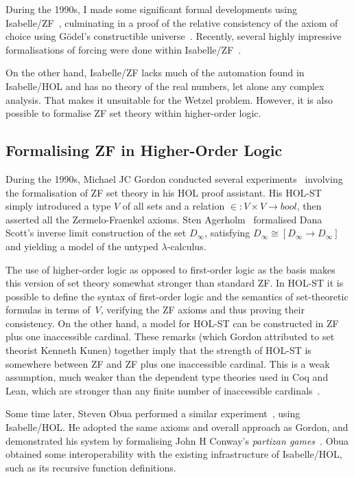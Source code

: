 \documentclass[runningheads]{llncs}
\begin{document}
During the 1990s, I made some significant formal developments using Isabelle/ZF~\cite{paulson-reflection}, culminating in a proof of the relative consistency of the axiom of choice using Gödel's constructible universe~\cite{paulson-consistency}. Recently, several highly impressive formalisations of forcing were done within Isabelle/ZF~\cite{gunther-forcing,Independence_CH-AFP}.

On the other hand, Isabelle/ZF lacks much of the automation found in Isabelle/HOL and has no theory of the real numbers, let alone any complex analysis.
That makes it unsuitable for the Wetzel problem. However, it is also possible to formalise ZF set theory within higher-order logic.

\subsection{Formalising ZF in Higher-Order Logic}

During the 1990s, Michael JC Gordon conducted several experiments~\cite{gordon-set-theory} involving the formalisation of ZF set theory in his HOL proof assistant. 
His HOL-ST simply introduced a type $V$ of all sets and a relation ${\in}:V\times V\to bool$, then asserted all the Zermelo-Fraenkel axioms. 
Sten Agerholm~\cite{agerholm-comparison} formalised Dana Scott's inverse limit construction of the set $D_\infty$, satisfying
$D_\infty \cong [D_\infty\to D_\infty]$ and yielding a model of the untyped $\lambda$-calculus.

The use of higher-order logic as opposed to first-order logic as the basis makes this version of set theory somewhat stronger than standard ZF\@. 
In HOL-ST it is possible to define the syntax of first-order logic and the semantics of set-theoretic formulas in terms of~$V$, verifying the ZF axioms and thus proving their consistency.
On the other hand, a model for HOL-ST can be constructed in ZF plus one inaccessible cardinal. 
These remarks (which Gordon attributed to set theorist Kenneth Kunen) together imply that 
the strength of HOL-ST is somewhere between ZF and ZF plus one inaccessible cardinal.
This is a weak assumption, much weaker than the dependent type theories used in Coq and Lean, which are stronger than any finite number of inaccessible cardinals~\cite{werner-sets-types}.

Some time later, Steven Obua performed a similar experiment~\cite{obua-partizan-games}, using Isabelle/HOL\@.
He adopted the same axioms and overall approach as Gordon, and demonstrated his system by formalising John H Conway's \textit{partizan games}~\cite{schleicher-conways-games}.
Obua obtained some interoperability with the existing infrastructure of Isabelle/HOL, such as its recursive function definitions. 
\end{document}
